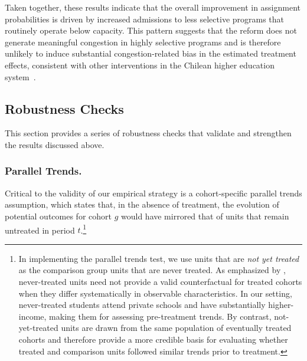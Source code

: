 


Taken together, these results indicate that the overall improvement in assignment probabilities is driven by increased admissions to less selective programs that routinely operate below capacity. This pattern suggests that the reform does not generate meaningful congestion in highly selective programs and is therefore unlikely to induce substantial congestion-related bias in the estimated treatment effects, consistent with other interventions in the Chilean higher education system~\citep{larroucau2025}.


\subsection{Robustness Checks}
This section provides a series of robustness checks that validate and strengthen the results discussed above.

\subsubsection{Parallel Trends.} 
Critical to the validity of our empirical strategy is a cohort-specific parallel trends assumption, which states that, in the absence of treatment, the evolution of potential outcomes for cohort $g$ would have mirrored that of units that remain untreated in period $t$.\footnote{In implementing the parallel trends test, we use units that are \emph{not yet treated} as the comparison group  units that are never treated. As emphasized by \citet{callaway2021}, never-treated units need not provide a valid counterfactual for treated cohorts when they differ systematically in observable characteristics. In our setting, never-treated students attend private schools and have substantially higher-income, making them  for assessing pre-treatment trends. By contrast, not-yet-treated units are drawn from the same population of eventually treated cohorts and therefore provide a more credible basis for evaluating whether treated and comparison units followed similar trends prior to treatment.}
 


